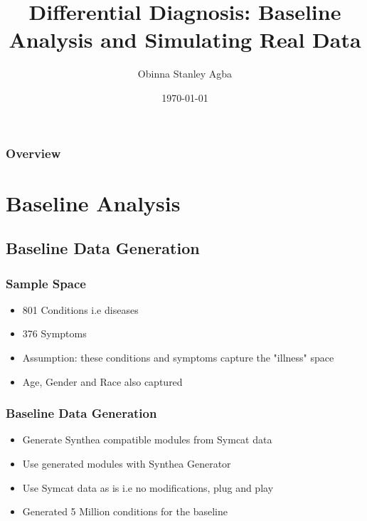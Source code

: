\documentclass{beamer}
\title[An Update]{Differential Diagnosis: Baseline Analysis and Simulating Real Data} %
\author{Obinna Stanley Agba} %
\institute[TU Delft] %
{
Delft University of Technology \\ %
\medskip
\textit{o.s.agba@student.tudelft.nl} %
}
\date{\today} %
\begin{document}
\begin{frame}
\titlepage %
\end{frame}

\begin{frame}
\frametitle{Overview} %
\tableofcontents %
\end{frame}


\section{Baseline Analysis} %
\subsection{Baseline Data Generation}
\begin{frame}
\frametitle{Sample Space}
\begin{itemize}
	\item 801 Conditions i.e diseases
	\item 376 Symptoms
	\item Assumption: these conditions and symptoms capture the "illness" space
	\item Age, Gender and Race also captured
\end{itemize}
\end{frame}

\begin{frame}
\frametitle{Baseline Data Generation}
\begin{itemize}
	\item Generate Synthea compatible modules from Symcat data
	\item Use generated modules with Synthea Generator
	\item Use Symcat data as is i.e no modifications, plug and play
	\item Generated 5 Million conditions for the baseline
\end{itemize}
\end{frame}
\end{document}
